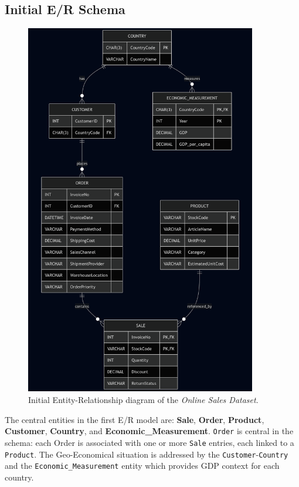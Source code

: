 \documentclass[a4paper,11pt]{article}
\begin{document}
\subsection{Initial E/R Schema}
\begin{figure}[H]
\centering
\includegraphics[width=0.9\textwidth]{../Graphs/0_Schema_ER.png}
\caption{Initial Entity-Relationship diagram of the \textit{Online Sales Dataset}.}
\label{fig:initial_er_schema}
\end{figure}

The central entities in the first E/R model are: \textbf{Sale}, \textbf{Order}, \textbf{Product}, \textbf{Customer}, \textbf{Country}, and \textbf{Economic\_Measurement}.
\texttt{Order} is central in the schema: each Order is associated with one or more \texttt{Sale} entries, each linked to a \texttt{Product}.
The Geo-Economical situation is addressed by the \texttt{Customer}-\texttt{Country} and the \texttt{Economic\_Measurement} entity which provides GDP context for each country.
\end{document}
